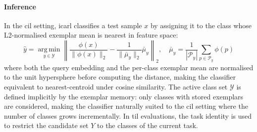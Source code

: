 \paragraph{Inference}
In the \gls{cil} setting, \gls{icarl} classifies a test sample $x$ by assigning it to the class whose L2-normalised exemplar mean is nearest in feature space:
%
\begin{equation}\label{eqn:icarl_inference}
    \hat{y} = \operatorname*{arg\,min}_{y \in \mathcal{Y}}
    \left\|
      \frac{\phi(x)}{\|\phi(x)\|_2}
      - \frac{1}{\|\bar{\mu}_y\|_2}\bar{\mu}_y
    \right\|_2, \quad
    \bar{\mu}_y = \frac{1}{|\mathcal{P}_y|}\sum_{p \in \mathcal{P}_y} \phi(p)
\end{equation}
%
where both the query embedding and the per-class exemplar mean are normalised to the unit hypersphere before computing the distance, making the classifier equivalent to nearest-centroid under cosine similarity. The active class set $\mathcal{Y}$ is defined implicitly by the exemplar memory: only classes with stored exemplars are considered, making the classifier naturally suited to the \gls{cil} setting where the number of classes grows incrementally. In \gls{til} evaluations, the task identity is used to restrict the candidate set $Y$ to the classes of the current task.